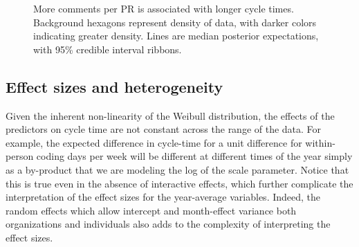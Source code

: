 \documentclass[manuscript,screen,review]{acmart}
\begin{document}
\begin{figure}


\caption[More comments per PR is associated with longer cycle
times]{\label{fig-comments}More comments per PR is associated with
longer cycle times. Background hexagons represent density of data, with
darker colors indicating greater density. Lines are median posterior
expectations, with 95\% credible interval ribbons.}

\end{figure}%

\subsection{Effect sizes and
heterogeneity}\label{effect-sizes-and-heterogeneity}

Given the inherent non-linearity of the Weibull distribution, the
effects of the predictors on cycle time are not constant across the
range of the data. For example, the expected difference in cycle-time
for a unit difference for within-person coding days per week will be
different at different times of the year simply as a by-product that we
are modeling the log of the scale parameter. Notice that this is true
even in the absence of interactive effects, which further complicate the
interpretation of the effect sizes for the year-average variables.
Indeed, the random effects which allow intercept and month-effect
variance both organizations and individuals also adds to the complexity
of interpreting the effect sizes.
\end{document}
